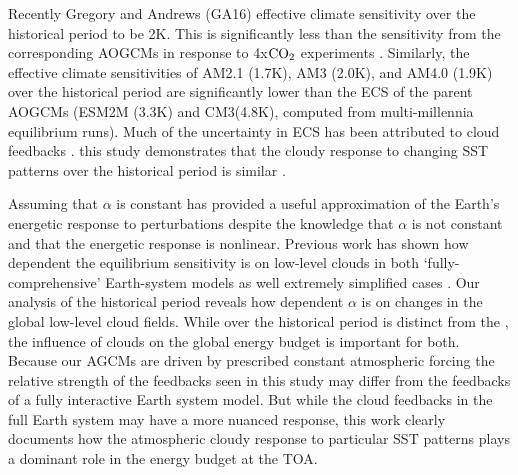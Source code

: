 Recently Gregory and Andrews (GA16)  effective climate sensitivity over the historical period to be 2K.  This is significantly less than the sensitivity from the corresponding AOGCMs in response to 4x$\rm{CO}_2$ experiments \citep{Andrews_etal_2012}.  
Similarly, the effective climate sensitivities of AM2.1 (1.7K), AM3 (2.0K), and AM4.0 (1.9K) over the historical period are significantly lower than the ECS of the parent AOGCMs (ESM2M (3.3K) and CM3(4.8K), computed from multi-millennia equilibrium runs).    Much of the uncertainty in  ECS  has been attributed to cloud feedbacks 
\citep{Cess_etal_1989, Bony_Dufresne_2005}.  
 this study demonstrates that the cloudy response to changing SST patterns over the historical period is similar . 

Assuming that $\alpha$ is constant has provided a useful approximation of the Earth's energetic response to perturbations despite the knowledge \citep [e.g.,][]{Senior_Mitchell_2000, Andrews_etal_2012, Armour_etal_2013, Andrews_etal_2015} that $\alpha$ is not constant and that the energetic response is nonlinear.  
Previous work has shown how dependent the equilibrium sensitivity is on low-level clouds in both `fully-comprehensive' Earth-system models \citep{Vial_etal_2013, Sherwood_etal_2014, Paynter_Frolicher_2015} 
as well extremely simplified cases \citep{Silvers_etal_2016}.   Our analysis of the historical period reveals how dependent $\alpha$ is on changes in the global low-level cloud fields.  While  over the historical period is distinct from the , the influence of clouds on the global energy budget is important for both.   Because our AGCMs are driven by prescribed  constant atmospheric forcing the relative strength of the feedbacks seen in this study may differ from the feedbacks of a fully interactive Earth system model.  But while the cloud feedbacks in the full Earth system may have a more nuanced response, 
this work clearly documents how the atmospheric cloudy response to particular SST patterns plays a dominant role in the energy budget at the TOA.

